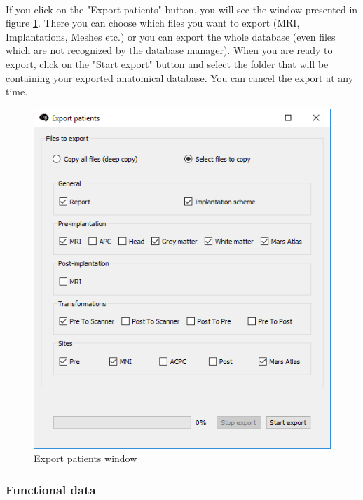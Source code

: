 \documentclass[a4paper]{article}
\begin{document}
\paragraph{} If you click on the "Export patients" button, you will see the window presented in figure \ref{dbManagerExportPatient}. There you can choose which files you want to export (MRI, Implantations, Meshes etc.) or you can export the whole database (even files which are not recognized by the database manager). When you are ready to export, click on the "Start export" button and select the folder that will be containing your exported anatomical database. You can cancel the export at any time.
\begin{figure}[H]
\begin{center}
\includegraphics[scale=0.5]{ExportPatient.png}
\end{center}
\caption{\label{dbManagerExportPatient}Export patients window}
\end{figure}
\subsubsection{Functional data}\label{exportFunctional}
\end{document}
